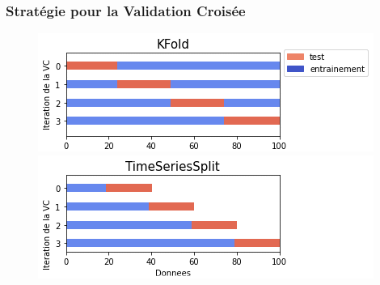 \documentclass{beamer}[aspectratio = 43]
\begin{document}
\begin{frame}
	\frametitle{Stratégie pour la Validation Croisée}
		\begin{figure}[h]
			\centering
			\includegraphics[scale=0.7]{kfold_}
			\includegraphics[scale=0.7]{tscv_}
		\end{figure}
\end{frame}
\end{document}
